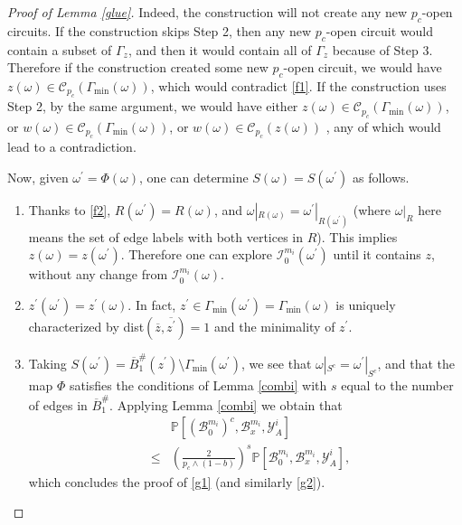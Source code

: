 \documentclass[12pt, twoside,a4paper,reqno]{amsart}
\theoremstyle{plain}
\theoremstyle{remark}
\theoremstyle{definition}
\renewcommand{\bar}{\overline}
\begin{document}
\begin{proof}[Proof of Lemma \ref{glue}]
Indeed, the construction will not create any new $p_{c}$-open circuits. If
the construction skips Step 2, then any new $p_{c}$-open circuit would contain a
subset of $\Gamma _{z}$, and then it would contain all of $\Gamma _{z}$ because of
Step 3. Therefore if the construction created some new $p_{c}$-open circuit,
we would have $z\left( \omega \right) \in \mathcal{C}_{p_{c}}\left( \Gamma
_{\min }\left( \omega \right) \right) $, which would contradict \eqref{f1}. If
the construction uses Step 2, by the same argument, we would have either $%
z\left( \omega \right) \in \mathcal{C}_{p_{c}}\left( \Gamma _{\min }\left(
\omega \right) \right) $, or $w\left( \omega \right) \in \mathcal{C}%
_{p_{c}}\left( \Gamma _{\min }\left( \omega \right) \right) $, or $w\left(
\omega \right) \in \mathcal{C}_{p_{c}}\left( z\left( \omega \right) \right) $%
, any of which would lead to a contradiction.

Now, given $\omega ^{\prime } = \Phi(\omega)$, one can determine $S(\omega)= S(\omega ^{\prime }) $ as follows.

\begin{enumerate}
\item Thanks to \eqref{f2}, $R(\omega ^{\prime })=R\left( \omega \right) $,
and $\omega |_{R\left( \omega \right) }=\omega ^{\prime }|_{R\left( \omega
^{\prime }\right) }$ (where $\omega |_{R}$ here means the set of edge labels with both vertices in $R$). This implies $z\left( \omega \right) =z\left( \omega%
^{\prime }\right) $. Therefore one can explore $\mathcal{I}%
_{0}^{m_{i}}\left( \omega ^{\prime }\right) $ until it contains $z$,
without any change from $\mathcal{I}%
_{0}^{m_{i}}\left( \omega \right) $.

\item $z^{\prime }\left( \omega ^{\prime }\right) =z^{\prime }\left( \omega
\right) $. In fact, $z^{\prime }\in \Gamma _{\min }\left( \omega ^{\prime
}\right) =\Gamma _{\min }\left( \omega \right) $ is uniquely characterized
by dist$\left( \bar{z},\bar{z^{\prime }}\right) =1$ and the minimality of
 $z^{\prime }$.

\item Taking $S\left( \omega ^{\prime }\right) =\bar{B}_{1}^{\#}\left( z^{\prime
}\right) \setminus \Gamma_{\min}(\omega ^{\prime })$, we see that $\omega |_{S^{c}}=\omega ^{\prime }|_{S^{c}}$, and
that the map $\Phi $ satisfies the conditions of Lemma \ref{combi} with $s$ equal
to the number of edges in $\bar{B}_{1}^{\#}$. Applying Lemma \ref{combi} we
obtain that
\begin{eqnarray*}
&&\mathbb{P}\left[ \left( \mathcal{B}_{0}^{m_{i}}\right) ^{c},\mathcal{B}%
_{x}^{m_{i}},\mathcal{Y}_{A}^{i}\right]  \\
&\leq &\left( \frac{2}{p_{c}\wedge \left( 1-b\right) }\right) ^{s}\mathbb{P}%
\left[ \mathcal{B}_{0}^{m_{i}},\mathcal{B}_{x}^{m_{i}},\mathcal{Y}_{A}^{i}%
\right] ,
\end{eqnarray*}%
which concludes the proof of \eqref{g1} (and similarly \eqref{g2}).
\end{enumerate}


\end{proof}
\end{document}
